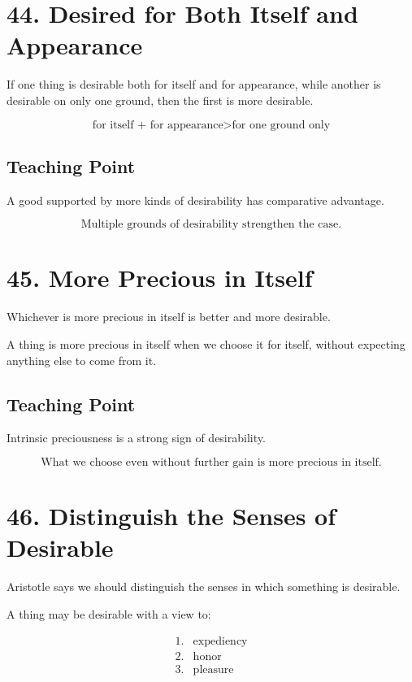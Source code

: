 \documentclass[12pt]{article}
\begin{document}
\section*{44. Desired for Both Itself and Appearance}

If one thing is desirable both for itself and for appearance, while another is
desirable on only one ground, then the first is more desirable.

\[
\text{for itself + for appearance} > \text{for one ground only}
\]

\subsection*{Teaching Point}

A good supported by more kinds of desirability has comparative advantage.

\[
\boxed{
\text{Multiple grounds of desirability strengthen the case.}
}
\]

\section*{45. More Precious in Itself}

Whichever is more precious in itself is better and more desirable.

A thing is more precious in itself when we choose it for itself, without
expecting anything else to come from it.

\subsection*{Teaching Point}

Intrinsic preciousness is a strong sign of desirability.

\[
\boxed{
\text{What we choose even without further gain is more precious in itself.}
}
\]

\section*{46. Distinguish the Senses of Desirable}

Aristotle says we should distinguish the senses in which something is
desirable.

A thing may be desirable with a view to:

\[
\begin{array}{ll}
1. & \text{expediency} \\
2. & \text{honor} \\
3. & \text{pleasure}
\end{array}
\]
\end{document}

